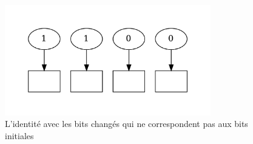 \documentclass[a4paper,12pt]{article}
\begin{document}
\begin{figure}[H]
    \centering
    \includegraphics[width=0.8\textwidth]{figures/two_errors/encoder_decoder_compose.png}
    \caption{L'identité avec les bits changés qui ne correspondent pas aux bits initiales}
    \label{fig:identity-two-errors}
\end{figure}

\listoffigures
\end{document}
